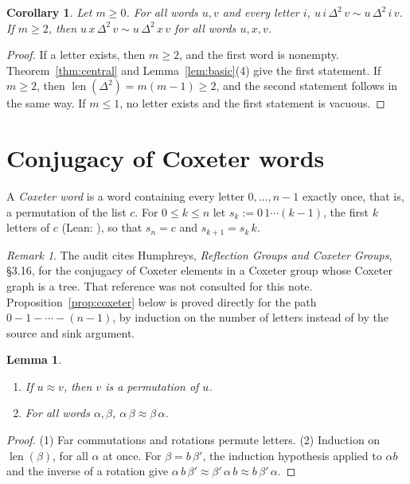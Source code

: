 \documentclass[11pt]{amsart}
\newtheorem{lemma}[theorem]{Lemma}
\newtheorem{corollary}[theorem]{Corollary}
\theoremstyle{definition}
\theoremstyle{remark}
\newtheorem{remark}[theorem]{Remark}
\newcommand{\lean}[1]{\texttt{\seqsplit{#1}}}
\newcommand{\conj}{\sim}
\newcommand{\rot}{\approx}
\DeclareMathOperator{\len}{len}
\begin{document}
\begin{corollary}\label{cor:central-conj}
Let $m\ge0$. For all words $u,v$ and every letter $i$,
$u\,i\,\Delta^2\,v\conj u\,\Delta^2\,i\,v$. If $m\ge2$, then $u\,x\,\Delta^2\,v\conj u\,\Delta^2\,x\,v$
for all words $u,x,v$.
\end{corollary}

\begin{proof}
If a letter exists, then $m\ge2$, and the first word is nonempty. Theorem~\ref{thm:central} and
Lemma~\ref{lem:basic}(4) give the first statement. If $m\ge2$, then $\len(\Delta^2)=m(m-1)\ge2$, and
the second statement follows in the same way. If $m\le1$, no letter exists and the first statement
is vacuous.
\end{proof}

\section{Conjugacy of Coxeter words}\label{sec:coxeter}

A \emph{Coxeter word} is a word containing every letter $0,\dots,n-1$ exactly once, that is, a
permutation of the list $c$. For $0\le k\le n$ let $s_k:=0\,1\cdots(k-1)$, the first $k$ letters of
$c$ (Lean: \lean{(List.finRange (m - 1)).take k}), so that $s_n=c$ and $s_{k+1}=s_k\,k$.

\begin{remark}\label{rem:humphreys}
The audit cites Humphreys, \emph{Reflection Groups and Coxeter Groups}, \S3.16, for the conjugacy of
Coxeter elements in a Coxeter group whose Coxeter graph is a tree. That reference was not consulted
for this note. Proposition~\ref{prop:coxeter} below is proved directly for the path
$0-1-\cdots-(n-1)$, by induction on the number of letters instead of by the source and sink argument.
\end{remark}

\begin{lemma}\label{lem:rot}
\begin{enumerate}
\item If $u\rot v$, then $v$ is a permutation of $u$.
\item For all words $\alpha,\beta$, $\alpha\,\beta\rot\beta\,\alpha$.
\end{enumerate}
\end{lemma}

\begin{proof}
(1) Far commutations and rotations permute letters. (2) Induction on $\len(\beta)$, for all
$\alpha$ at once. For $\beta=b\,\beta'$, the induction hypothesis applied to $\alpha b$ and the
inverse of a rotation give
$\alpha\,b\,\beta'\rot\beta'\,\alpha\,b\rot b\,\beta'\,\alpha$.
\end{proof}
\end{document}

